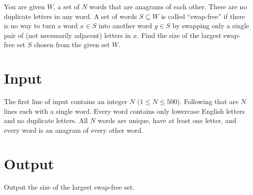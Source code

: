 

\noindent
You are given $W$, a set of $N$ words that are anagrams of each other.
There are no duplicate letters in any word. A set of words $S \subseteq W$ is
called ``swap-free'' if there is no way to turn a word $x \in S$ into another word $y \in S$ by swapping only
a single pair of (not necessarily adjacent) letters in $x$. Find the size of the largest
swap-free set $S$ chosen from the given set $W$.

\section*{Input}

The first line of input contains an integer $N$ ($1 \le N \le 500$).
Following that are $N$ lines each with a single word.
Every word contains only lowercase English letters and no duplicate letters.
All $N$ words are unique, have at least one letter, and every word is an anagram of every
other word.

\section*{Output}

Output the size of the largest swap-free set.


